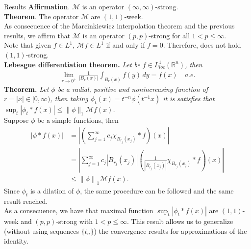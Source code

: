 \documentclass[final]{beamer}
\providecommand{\norm}[1]{\left\|#1\right\|}
\newlength{\colwidth}
\begin{document}
\begin{frame}[t]
\begin{columns}[t]
\begin{column}{\colwidth}
  \begin{alertblock}{Results}
    \textbf{Affirmation}. $\mathcal{M}$ is an operator $(\infty,\infty)$-strong.\\
    {\bf Theorem}. {The operator $\mathcal{M}$ are $(1,1)$-week.}\\
    As consecuence of the Marcinkiewicz interpolation theorem and the previous results, we affirm that $\mathcal{M}$ is an operator $(p,p)$-strong for all $1<p\leq \infty$.\\
      Note that given $f\in L^1$, $\mathcal{M}f \in L^1$ if and only if $f=0$. Therefore, does not hold $(1,1)$-strong.\\
      \vspace{0.2cm}
    \textbf{Lebesgue differentiation theorem.} \emph{Let be $f\in L^{1}_{loc}(\mathbb{R}^{n})$, then
      \begin{align*}
        \lim_{r \to 0^{+}}\frac{1}{|B_{r}(x)|}\int_{B_{r}(x)}f(y)\, dy=f(x)\quad a.e.
      \end{align*}}
      \vspace{0.2cm}
    \textbf{Theorem.} \emph{Let $\phi$ be a radial, positive and nonincreasing function of $r=|x|\in [0,\infty)$, then taking $\phi_{t}(x)=t^{-n}\phi(t^{-1}x)$ it is satisfies that $\sup_{t}|\phi_t\ast f(x)|\leq \|\phi\|_1\mathcal{M}f(x)$.}\\
      Suppose $\phi$ be a simple functions, then
      \begin{align*}
        \left|\phi*f(x)\right|&=\left|\left(\sum_{j=1}^{\infty}c_j\chi_{B_{r_j}(x_j)}*f\right)(x)\right|\\
        &=\left|\sum_{j=1}^{\infty}c_{j}|B_{r_j}(x_j)|\left( \frac{1}{|B_{r_{j}}(x_j)|}\chi_{B_{r_j}(x_j)}*f \right)(x)\right|\\
        &\leq\norm{\phi}_{1}\mathcal{M}f(x).
      \end{align*}
      Since $\phi_{t}$ is a dilation of $\phi$, the same procedure can be followed and the same result reached.\\
    As a consecuence, we have that maximal function $\sup_{t}|\phi_t\ast f(x)|$ are $(1,1)$-week and $(p,p)$-strong with $1< p \leq \infty$.
    This result allows us to generalize (without using sequences $\{t_n\}$) the convergence results for approximations of the identity.


\end{alertblock}
\end{column}
\end{columns}
\end{frame}
\end{document}

